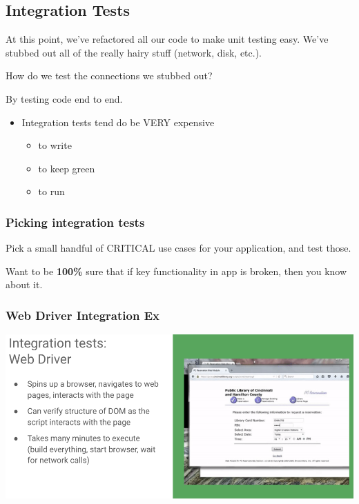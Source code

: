 \documentclass{article}
\begin{document}
\subsection{Integration Tests}

At this point, we've refactored all our code to make unit testing easy. We've stubbed out all of the really hairy stuff (network, disk, etc.). 

\vspace*{1em}

How do we test the connections we stubbed out?

By testing code end to end.

\begin{itemize}
    \item Integration tests tend do be VERY expensive
    \begin{itemize}
        \item to write
        \item to keep green
        \item to run
    \end{itemize}
\end{itemize}

\subsubsection*{Picking integration tests}

Pick a small handful of CRITICAL use cases for your application, and test those. 

\vspace*{1em}

Want to be \textbf{100\%} sure that if key functionality in app is broken, then you know about it.

\subsubsection*{Web Driver Integration Ex}

\includegraphics*[width=\linewidth]{integrationTestEx.png}
\end{document}
